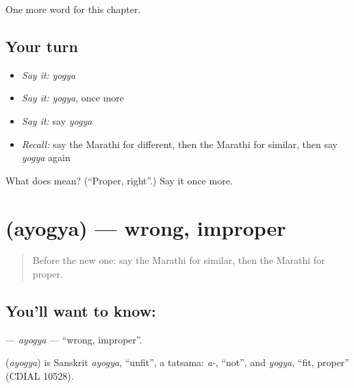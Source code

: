 \begin{grammarlens}[title={What you've built}]
One more word for this chapter.
\end{grammarlens}

\subsection*{Your turn}
\begin{itemize}
\raggedright
  \item \emph{Say it:} \emph{yogya}
  \item \emph{Say it:} \emph{yogya}, once more
  \item \emph{Say it:} say \emph{yogya}
  \item \emph{Recall:} say the Marathi for different, then the Marathi for similar, then say \emph{yogya} again
\end{itemize}

\begin{tcolorbox}[breakable,colback=teal!4,colframe=teal!35!black,title={Before you move on}]
What does  mean? (\textquotedblleft{}Proper, right\textquotedblright{}.) Say it once more.
\end{tcolorbox}
\section[\texorpdfstring{\mr{अयोग्य} (ayogya)}{अयोग्य (ayogya)}]{ (ayogya) — wrong, improper}

\label{lesson:MR-C175-ayogya}



\begin{quote}
Before the new one: say the Marathi for similar, then the Marathi for proper.
\end{quote}

\subsection*{You'll want to know: }
\textbf{} — \emph{ayogya} — \textquotedblleft{}wrong, improper\textquotedblright{}.

\begin{cousinweb}
\textbf{} (\emph{ayogya}) is Sanskrit \emph{ayogya}, \textquotedblleft{}unfit\textquotedblright{}, a tatsama: \emph{a-}, \textquotedblleft{}not\textquotedblright{}, and \emph{yogya}, \textquotedblleft{}fit, proper\textquotedblright{} (CDIAL 10528).
\end{cousinweb}


